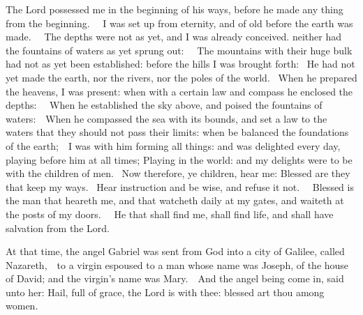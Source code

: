 \begin{multicols}{2}
\bigskip




The Lord possessed me in the beginning of his ways, before he made any thing
from the beginning.   I was set up from eternity, and of old before the earth
was made.   The depths were not as yet, and I was already conceived. neither
had the fountains of waters as yet sprung out:   The mountains with their huge
bulk had not as yet been established: before the hills I was brought forth:  He
had not yet made the earth, nor the rivers, nor the poles of the world.  When
he prepared the heavens, I was present: when with a certain law and compass he
enclosed the depths:   When he established the sky above, and poised the
fountains of waters:  When he compassed the sea with its bounds, and set a law
to the waters that they should not pass their limits: when be balanced the
foundations of the earth;  I was with him forming all things: and was delighted
every day, playing before him at all times; Playing in the world: and my
delights were to be with the children of men.  Now therefore, ye children, hear
me: Blessed are they that keep my ways.  Hear instruction and be wise, and
refuse it not.   Blessed is the man that heareth me, and that watcheth daily at
my gates, and waiteth at the posts of my doors.   He that shall find me, shall
find life, and shall have salvation from the Lord.



At that time, the angel Gabriel was sent from God into a city of
Galilee, called Nazareth,  to a virgin espoused to a man whose name was Joseph,
of the house of David; and the virgin's name was Mary.  And the angel being
come in, said unto her: Hail, full of grace, the Lord is with thee: blessed art
thou among women. 



\bigskip




\end{multicols}
